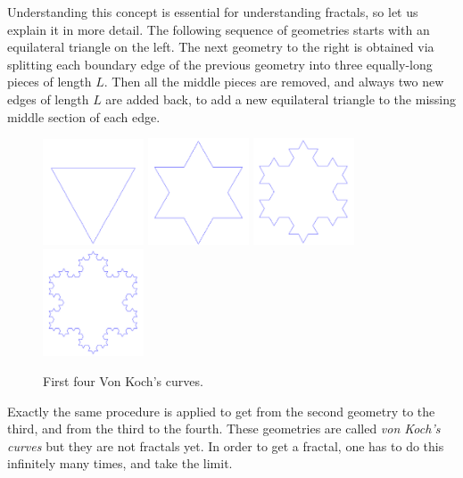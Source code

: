 \documentclass[article,A4,12pt]{llncs}
\begin{document}
Understanding this concept is essential for understanding fractals, so let us explain it in more 
detail. The following sequence of geometries starts with an equilateral triangle on the left.
The next geometry to the right is obtained via splitting each boundary edge of the previous 
geometry into three equally-long pieces of length $L$. Then all the middle pieces are removed, 
and always two new edges of length $L$ are added back, to add a new equilateral triangle to 
the missing middle section of each edge.\\[-6mm]

\begin{figure}[!ht]
\begin{center}
\includegraphics[width=3cm]{img/s1.png}
\includegraphics[width=3cm]{img/s2.png}
\includegraphics[width=3cm]{img/s3.png}
\includegraphics[width=3cm]{img/s4.png}
\end{center}
\vspace{-4mm}
\caption{First four Von Koch's curves.}
\vspace{-4mm}
\end{figure}

\noindent
Exactly the same procedure is applied to get from the second geometry to the third, and from the 
third to the fourth. These geometries are called {\em von Koch's curves} but they are not fractals 
yet. In order to get a fractal, one 
has to do this infinitely many times, and take the limit. \\
\end{document}
